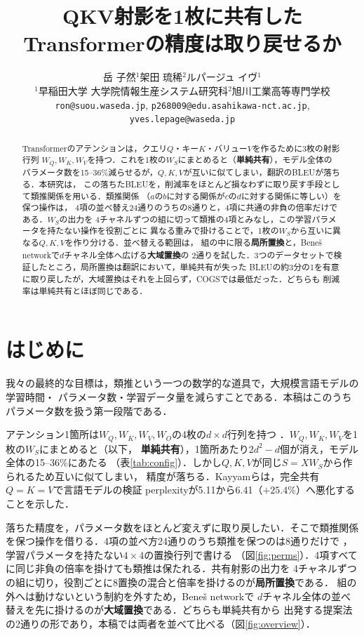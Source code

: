 \documentclass{nlp2026}
\title{QKV射影を1枚に共有したTransformerの精度は取り戻せるか}
\author{%
岳 子然$^{1}$\quad 架田 琉稀$^{2}$\quad ルパージュ イヴ$^{1}$\\
$^{1}$早稲田大学 大学院情報生産システム研究科\quad $^{2}$旭川工業高等専門学校\\
\texttt{ron@suou.waseda.jp}, \texttt{p268009@edu.asahikawa-nct.ac.jp},\\
\texttt{yves.lepage@waseda.jp}}
\begin{document}
\maketitle

\begin{abstract}
Transformerのアテンションは，クエリ$Q$・キー$K$・バリュー$V$を作るために3枚の射影行列
$W_Q,W_K,W_V$を持つ．これを1枚の$W_S$にまとめると（\textbf{単純共有}），モデル全体の
パラメータ数を15--36\%減らせるが，$Q,K,V$が互いに似てしまい，翻訳のBLEUが落ちる．本研究は，
この落ちたBLEUを，削減率をほとんど損なわずに取り戻す手段として類推関係を用いる．類推関係
（$a$の$b$に対する関係が$c$の$d$に対する関係に等しい）を保つ操作は，
4項の並べ替え24通りのうちの8通りと，4項に共通の非負の倍率だけである．$W_S$の出力を
4チャネルずつの組に切って類推の4項とみなし，この学習パラメータを持たない操作を役割ごとに
異なる重みで掛けることで，1枚の$W_S$から互いに異なる$Q,K,V$を作り分ける．並べ替える範囲は，
組の中に限る\textbf{局所置換}と，Beneš networkで$d$チャネル全体へ広げる\textbf{大域置換}の
2通りを試した．3つのデータセットで検証したところ，局所置換は翻訳において，単純共有が失った
BLEUの約3分の1を有意に取り戻したが，大域置換はそれを上回らず，COGSでは最低だった．どちらも
削減率は単純共有とほぼ同じである．
\end{abstract}

\section{はじめに}
\label{sec:introduction}

我々の最終的な目標は，類推という一つの数学的な道具で，大規模言語モデルの学習時間・
パラメータ数・学習データ量を減らすことである．本稿はこのうちパラメータ数を扱う第一段階である．

アテンション1箇所は$W_Q,W_K,W_V,W_O$の4枚の$d\times d$行列を持つ
\cite{vaswani2017attention}．$W_Q,W_K,W_V$を1枚の$W_S$にまとめると（以下，
\textbf{単純共有}），1箇所あたり$2d^2-d$個が消え，モデル全体の15--36\%にあたる
（表\ref{tab:config}）．しかし$Q,K,V$が同じ$S=XW_S$から作られるため互いに似てしまい，
精度が落ちる．Kayyamら\cite{kayyam2026three}は，完全共有$Q{=}K{=}V$で言語モデルの検証
perplexityが5.11から6.41（$+25.4\%$）へ悪化することを示した．

落ちた精度を，パラメータ数をほとんど変えずに取り戻したい．そこで類推関係
を保つ操作を借りる．4項の並べ方24通りのうち類推を保つのは8通りだけで
\cite{lepage2025jiaf}，学習パラメータを持たない$4\times4$の置換行列で書ける
（図\ref{fig:perms}）．4項すべてに同じ非負の倍率を掛けても類推は保たれる．共有射影の出力を
4チャネルずつの組に切り，役割ごとに8置換の混合と倍率を掛けるのが\textbf{局所置換}である．
組の外へは動けないという制約を外すため，Beneš network\cite{benes1964permutation}で
$d$チャネル全体の並べ替えを先に掛けるのが\textbf{大域置換}である．どちらも単純共有から
出発する提案法の2通りの形であり，本稿では両者を並べて比べる（図\ref{fig:overview}）．
\end{document}
